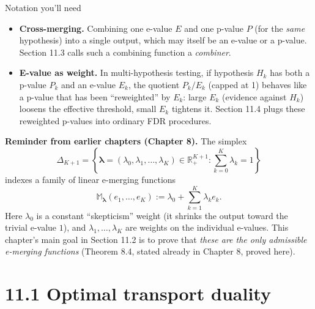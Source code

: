 \documentclass[aspectratio=169,10pt]{beamer}
\newcommand{\RR}{\mathbb{R}}
\newcommand{\1}{\mathbb{1}}
\begin{document}
\begin{frame}[allowframebreaks]{Notation you'll need}
\begin{itemize}
\item \textbf{Cross-merging.} Combining one e-value $E$ and one p-value $P$ (for the \emph{same} hypothesis) into a single output, which may itself be an e-value or a p-value. Section 11.3 calls such a combining function a \emph{combiner}.

\item \textbf{E-value as weight.} In multi-hypothesis testing, if hypothesis $H_k$ has both a p-value $P_k$ and an e-value $E_k$, the quotient $P_k/E_k$ (capped at 1) behaves like a p-value that has been ``reweighted'' by $E_k$: large $E_k$ (evidence against $H_k$) loosens the effective threshold, small $E_k$ tightens it. Section 11.4 plugs these reweighted p-values into ordinary FDR procedures.
\end{itemize}

\framebreak

\textbf{Reminder from earlier chapters (Chapter 8).} The simplex
\[
\Delta_{K+1} = \left\{ \boldsymbol\lambda = (\lambda_0,\lambda_1,\dots,\lambda_K) \in \RR_+^{K+1} : \sum_{k=0}^K \lambda_k = 1 \right\}
\]
indexes a family of linear e-merging functions
\[
\mathbb{M}_{\boldsymbol\lambda}(e_1,\dots,e_K) := \lambda_0 + \sum_{k=1}^K \lambda_k e_k .
\]
Here $\lambda_0$ is a constant ``skepticism'' weight (it shrinks the output toward the trivial e-value $1$), and $\lambda_1,\dots,\lambda_K$ are weights on the individual e-values. This chapter's main goal in Section 11.2 is to prove that \emph{these are the only admissible e-merging functions} (Theorem 8.4, stated already in Chapter 8, proved here).

\end{frame}

\section{11.1 Optimal transport duality}
\end{document}
